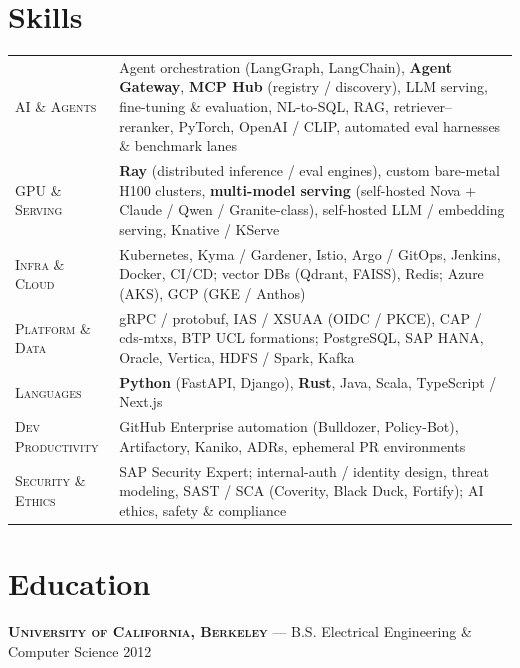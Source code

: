 \section{Skills}
\begin{tabularx}{\textwidth}{@{}>{\scshape}l X@{}}
  AI \& Agents      & Agent orchestration (LangGraph, LangChain), \textbf{Agent Gateway}, \textbf{MCP Hub} (registry / discovery), LLM serving, fine-tuning \& evaluation, NL-to-SQL, RAG, retriever--reranker, PyTorch, OpenAI / CLIP, automated eval harnesses \& benchmark lanes \\[\skillgap]
  GPU \& Serving    & \textbf{Ray} (distributed inference / eval engines), custom bare-metal H100 clusters, \textbf{multi-model serving} (self-hosted Nova + Claude / Qwen / Granite-class), self-hosted LLM / embedding serving, Knative / KServe \\[\skillgap]
  Infra \& Cloud    & Kubernetes, Kyma / Gardener, Istio, Argo / GitOps, Jenkins, Docker, CI/CD; vector DBs (Qdrant, FAISS), Redis; Azure (AKS), GCP (GKE / Anthos) \\[\skillgap]
  Platform \& Data  & gRPC / protobuf, IAS / XSUAA (OIDC / PKCE), CAP / cds-mtxs, BTP UCL formations; PostgreSQL, SAP HANA, Oracle, Vertica, HDFS / Spark, Kafka \\[\skillgap]
  Languages         & \textbf{Python} (FastAPI, Django), \textbf{Rust}, Java, Scala, TypeScript / Next.js \\[\skillgap]
  Dev Productivity  & GitHub Enterprise automation (Bulldozer, Policy-Bot), Artifactory, Kaniko, ADRs, ephemeral PR environments \\[\skillgap]
  Security \& Ethics & SAP Security Expert; internal-auth / identity design, threat modeling, SAST / SCA (Coverity, Black Duck, Fortify); AI ethics, safety \& compliance \\
\end{tabularx}

\section{Education}
{\scshape\bfseries University of California, Berkeley} --- B.S. Electrical Engineering \& Computer Science \hfill 2012
